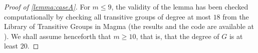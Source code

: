 \documentclass[a4paper]{amsart}
\newcommand{\Sym}{\mathrm{Sym}}
\newcommand{\Alt}{\mathrm{Alt}}
\renewcommand{\wr}{\mathop{\mathrm{wr}}}
\newcommand{\mix}{\mathop{\mathrm{mix}}}
\newcommand{\A}{\mathsf{A}}
\newcommand{\act}{\,\rotatebox[origin=c]{-180}{$\circlearrowright$}\,}
\newcommand{\PGammaL}{\rm P\Gamma L}
\newcommand{\PGL}{\rm PGL}
\newcommand{\GL}{\rm GL}
\newcommand{\PSL}{\rm PSL}
\newcommand{\Dih}{\rm Dih}
\newcommand{\ASL}{\rm ASL}
\theoremstyle{definition}
\begin{document}
\begin{proof}[Proof of \cref{lemma:caseA}]
 For $m\le 9$, the validity of the lemma has been checked computationally by checking all transitive groups of degree at most $18$ from the Library of Transitive Groups in Magma \cite{magma} (the results and the code are available at \cite{ourAlgorithm}). We shall  assume henceforth that $m\ge 10$, that is, that the degree of $G$ is at least $20$.



\end{proof}
\end{document}
